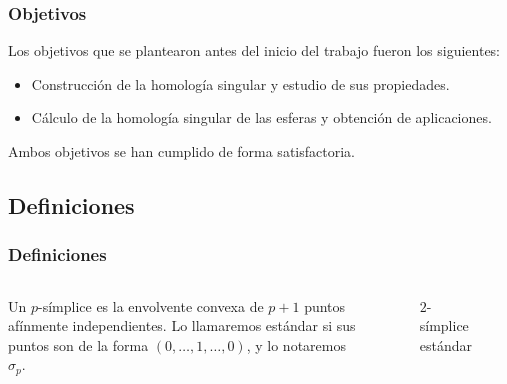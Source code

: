 \documentclass{beamer}
\theoremstyle{theorem}
\begin{document}

\begin{frame}
  \frametitle{Objetivos}
  Los objetivos que se plantearon antes del inicio del trabajo fueron los siguientes:
  \begin{itemize}
    \item Construcción de la homología singular y estudio de sus propiedades.
    \item Cálculo de la homología singular de las esferas y obtención de aplicaciones.
  \end{itemize}
  Ambos objetivos se han cumplido de forma satisfactoria.
\end{frame}


\subsection{Definiciones}

\begin{frame}
  \frametitle{Definiciones}
  \begin{columns}[c]

    Un $p$-símplice es la envolvente convexa de $p+1$ puntos afínmente independientes.
    Lo llamaremos estándar si sus puntos son de la forma $(0, \dots, 1, \dots, 0)$, y lo notaremos $\sigma_p$.

    \begin{figure}
      \caption{$2$-símplice estándar}
    \end{figure}

  \end{columns}

\end{frame}
\end{document}
